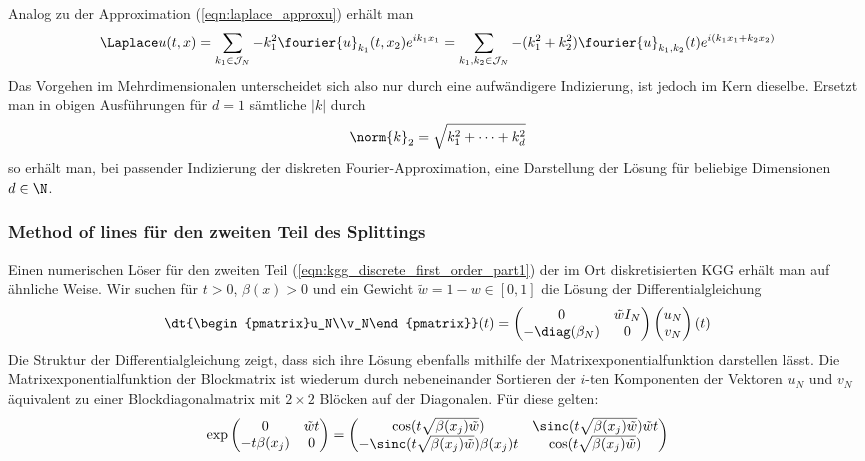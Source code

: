 Analog zu der Approximation (\ref{eqn:laplace_approxu}) erhält man
\[\Laplace u(t,x)=\sum_{k_1\in\mathcal{J}_N}-k_1^2\fourier{u}_{k_1}(t,x_2) e^{ik_1x_1}=\sum_{k_1,k_2\in\mathcal{J}_N}-(k_1^2+k_2^2)\fourier{u}_{k_1,k_2}(t)e^{i(k_1x_1+k_2x_2)}\]
Das Vorgehen im Mehrdimensionalen unterscheidet sich also nur durch eine aufwändigere Indizierung, ist jedoch im Kern dieselbe. Ersetzt man in obigen Ausführungen für $d=1$ sämtliche $|k|$ durch \[\norm{k}_2=\sqrt{k_1^2+\dots+k_d^2}\]so erhält man, bei passender Indizierung der diskreten Fourier-Approximation, eine Darstellung der Lösung für beliebige Dimensionen $d\in\N$.
\subsubsection*{Method of lines für den zweiten Teil des Splittings}
Einen numerischen Löser für den zweiten Teil (\ref{eqn:kgg_discrete_first_order_part1}) der im Ort diskretisierten KGG erhält man auf ähnliche Weise. Wir suchen für $t>0$, $\beta(x)>0$ und ein Gewicht $\tilde{w}=1-w\in [0,1]$ die Lösung der Differentialgleichung
\begin{equation*}
\dt{\begin{pmatrix}u_N\\v_N\end{pmatrix}}(t)=
\begin{pmatrix}0 & \tilde{w}I_N\\ -\diag({\beta_N}) & 0\end{pmatrix}
\begin{pmatrix}u_N\\v_N\end{pmatrix}(t)
\end{equation*}
Die Struktur der Differentialgleichung zeigt, dass sich ihre Lösung ebenfalls mithilfe der Matrixexponentialfunktion darstellen lässt. Die Matrixexponentialfunktion der Blockmatrix ist wiederum durch nebeneinander Sortieren der $i$-ten Komponenten der Vektoren $u_N$ und $v_N$ äquivalent zu einer Blockdiagonalmatrix mit $2\times 2$ Blöcken auf der Diagonalen. Für diese gelten:
\[\exp\begin{pmatrix}0 & \tilde{w}t\\ -t\beta(x_j) & 0\end{pmatrix}=
\begin{pmatrix}\cos(t\sqrt{\beta(x_j)\tilde{w}}) & \sinc(t\sqrt{\beta(x_j)\tilde{w}})\tilde{w}t\\
-\sinc(t\sqrt{\beta(x_j)\tilde{w}})\beta(x_j)t & \cos(t\sqrt{\beta(x_j)\tilde{w}})\end{pmatrix}\]
